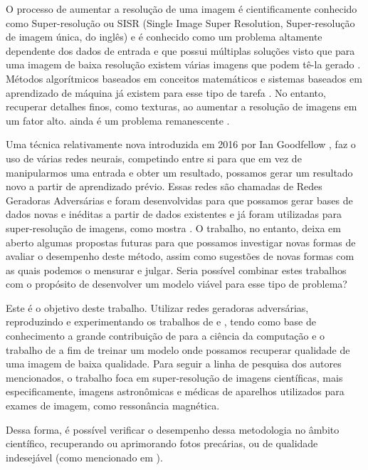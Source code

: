 O processo de aumentar a resolução de uma imagem é cientificamente conhecido como Super-resolução ou SISR (Single Image Super Resolution, Super-resolução de imagem única, do inglês) e é conhecido como um problema altamente dependente dos dados de entrada e que possui múltiplas soluções visto que para uma imagem de baixa resolução existem várias imagens que podem tê-la gerado  \cite{zhu_gan-based_2020}. Métodos algorítmicos baseados em conceitos matemáticos e sistemas baseados em aprendizado de máquina já existem para esse tipo de tarefa \cite{takemura_algoritmos_nodate, khaledyan_low-cost_2020}. No entanto, recuperar detalhes finos, como texturas, ao aumentar a resolução de imagens em um fator alto. ainda é um problema remanescente \cite{ledig_photo-realistic_2017}.

Uma técnica relativamente nova introduzida em 2016 por Ian Goodfellow \cite{goodfellow_generative_2014, goodfellow_nips_2017}, faz o uso de várias redes neurais, competindo entre si para que em vez de manipularmos uma entrada e obter um resultado, possamos gerar um resultado novo a partir de aprendizado prévio. Essas redes são chamadas de Redes Geradoras Adversárias e foram desenvolvidas para que possamos gerar bases de dados novas e inéditas a partir de dados existentes \cite{goodfellow_generative_2014, moreira_geracao_2019} e já foram utilizadas para super-resolução de imagens, como mostra \cite{moreira_geracao_2019}. O trabalho, no entanto, deixa em aberto algumas propostas futuras para que possamos investigar novas formas de avaliar o desempenho deste método, assim como sugestões de novas formas com as quais podemos o mensurar e julgar. Seria possível combinar estes trabalhos com o propósito de desenvolver um modelo viável para esse tipo de problema? 

Este é o objetivo deste trabalho. Utilizar redes geradoras adversárias, reproduzindo e experimentando os trabalhos de \cite{ledig_photo-realistic_2017} e \cite{wang_esrgan_2018}, tendo como base de conhecimento a grande contribuição de \cite{goodfellow_generative_2014} para a ciência da computação e o trabalho de \cite{moreira_geracao_2019} a fim de treinar um modelo onde possamos recuperar qualidade de uma imagem de baixa qualidade. Para seguir a linha de pesquisa dos autores mencionados, o trabalho foca em super-resolução de imagens científicas, mais especificamente, imagens astronômicas e médicas de aparelhos utilizados para exames de imagem, como ressonância magnética. 

Dessa forma, é possível verificar o desempenho dessa metodologia no âmbito científico, recuperando ou aprimorando fotos precárias, ou de qualidade indesejável (como mencionado em \cite{sun_super_2019, noauthor_review_2020, gupta_super-resolution_2020}). 

